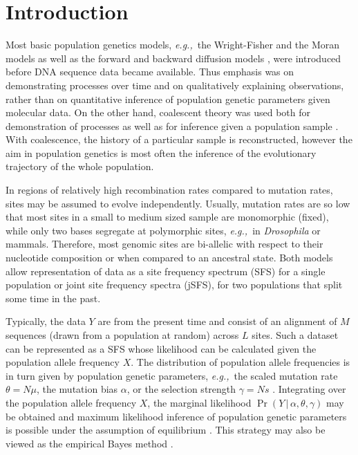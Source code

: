 \documentclass[preprint]{elsarticle}
\newcommand\given{{\,|\,}}
\newcommand\eg{{\it e.g.,}}
\begin{document}
\linenumbers

\section{Introduction}

Most basic population genetics models, \eg\ the Wright-Fisher and the Moran models as well as the forward and backward diffusion models \citep[reviewed in][]{Ewen04}, were introduced before DNA sequence data became available. Thus emphasis was on demonstrating processes over time and on qualitatively explaining observations, rather than on quantitative inference of population genetic parameters given molecular data. On the other hand, coalescent theory \citep{King82} was used both for demonstration of processes as well as for inference given a population sample \citep{Hein05,Wake09}. With coalescence, the history of a particular sample is reconstructed, however the aim in population genetics is most often the inference of the evolutionary trajectory of the whole population.

In regions of relatively high recombination rates compared to mutation rates, sites may be assumed to evolve independently. Usually, mutation rates are so low that most sites in a small to medium sized sample are monomorphic (fixed), while only two bases segregate at polymorphic sites, \eg\ in \textit{Drosophila} or mammals. Therefore, most genomic sites are bi-allelic with respect to their nucleotide composition or when compared to an ancestral state. Both models allow representation of data as a site frequency spectrum (SFS) for a single population or joint site frequency spectra (jSFS), for two populations that split some time in the past.

Typically, the data $Y$ are from the present time and consist of an alignment of $M$ sequences (drawn from a population at random) across $L$ sites. Such a dataset can be represented as a SFS whose likelihood can be calculated given the population allele frequency $X$. The distribution of population allele frequencies is in turn given by population genetic parameters, \eg\ the scaled mutation rate $\theta=N\mu$, the mutation bias $\alpha$, or the selection strength $\gamma=Ns$ \citep[as defined in][]{Vogl15}. Integrating over the population allele frequency $X$, the marginal likelihood $\Pr(Y\given \alpha,\theta,\gamma)$ may be obtained and maximum likelihood inference of population genetic parameters is possible under the assumption of equilibrium \citep{Vogl14b,Vogl15}. This strategy may also be viewed as the empirical Bayes method \citep[\eg][]{Carl00}. 
\end{document}
